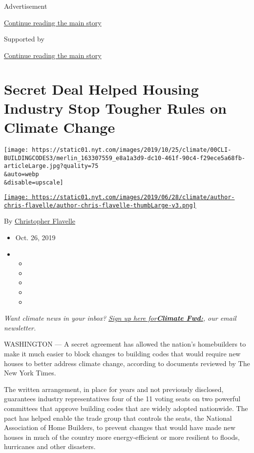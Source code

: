 Advertisement

\protect\hyperlink{after-top}{Continue reading the main story}

Supported by

\protect\hyperlink{after-sponsor}{Continue reading the main story}

\hypertarget{secret-deal-helped-housing-industry-stop-tougher-rules-on-climate-change}{%
\section{Secret Deal Helped Housing Industry Stop Tougher Rules on
Climate
Change}\label{secret-deal-helped-housing-industry-stop-tougher-rules-on-climate-change}}

\texttt{[image: https://static01.nyt.com/images/2019/10/25/climate/00CLI-BUILDINGCODES3/merlin\_163307559\_e8a1a3d9-dc10-461f-90c4-f29ece5a68fb-articleLarge.jpg?quality=75\\\&auto=webp\\\&disable=upscale]}

\href{https://www.nytimes.com/by/christopher-flavelle}{\texttt{[image: https://static01.nyt.com/images/2019/06/28/climate/author-chris-flavelle/author-chris-flavelle-thumbLarge-v3.png]}}

By \href{https://www.nytimes.com/by/christopher-flavelle}{Christopher
Flavelle}

\begin{itemize}
\item
  Oct. 26, 2019
\item
  \begin{itemize}
  \item
  \item
  \item
  \item
  \item
  \end{itemize}
\end{itemize}

\emph{Want climate news in your inbox?}
\href{https://www.nytimes.com/newsletters/climate-change}{\emph{Sign up
here
for}}\textbf{\href{https://www.nytimes.com/newsletters/climate-change}{\emph{Climate
Fwd:}}}\emph{, our email newsletter.}

WASHINGTON --- A secret agreement has allowed the nation's homebuilders
to make it much easier to block changes to building codes that would
require new houses to better address climate change, according to
documents reviewed by The New York Times.

The written arrangement, in place for years and not previously
disclosed, guarantees industry representatives four of the 11 voting
seats on two powerful committees that approve building codes that are
widely adopted nationwide. The pact has helped enable the trade group
that controls the seats, the National Association of Home Builders, to
prevent changes that would have made new houses in much of the country
more energy-efficient or more resilient to floods, hurricanes and other
disasters.

